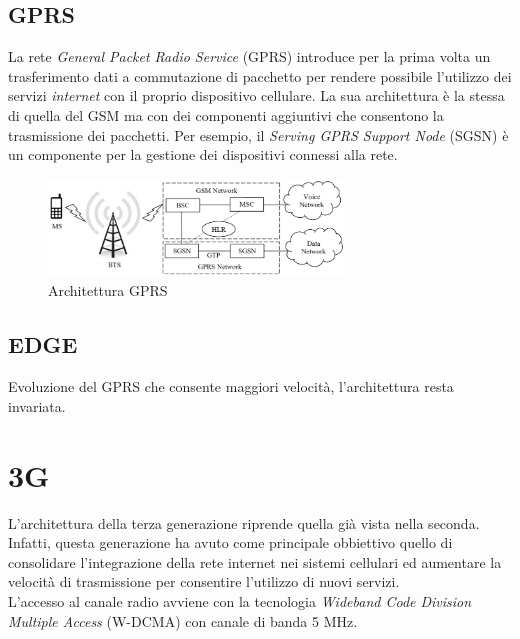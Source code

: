 \clearpage

\subsection{GPRS}
La rete \textit{General Packet Radio Service} (GPRS)\cite{gprs-edge} introduce per la prima volta un trasferimento dati a commutazione di pacchetto per rendere 
possibile l'utilizzo dei servizi \textit{internet} con il proprio dispositivo cellulare\cite{gsm-architecture}.
La sua architettura è la stessa di quella del GSM ma con dei componenti aggiuntivi che consentono la trasmissione dei pacchetti. 
Per esempio, il \textit{Serving GPRS Support Node} (SGSN) è un componente per la gestione dei dispositivi connessi alla rete.
\begin{figure}[ht]
    \centering
    \includegraphics[width=0.7\textwidth]{images/2g-gprs.png}
    \caption{Architettura GPRS}
\end{figure}
\subsection{EDGE}
Evoluzione del GPRS che consente maggiori velocità, l'architettura resta invariata\cite{gprs-edge}.

\clearpage

\section{3G}
L'architettura della terza generazione riprende quella già vista nella seconda. Infatti, questa generazione ha avuto come principale obbiettivo 
quello di consolidare l'integrazione della rete internet nei sistemi cellulari ed aumentare la velocità di trasmissione per consentire l'utilizzo 
di nuovi servizi.\\
L'accesso al canale radio avviene con la tecnologia \textit{Wideband Code Division Multiple Access} (W-DCMA) con canale di banda 5 MHz.


